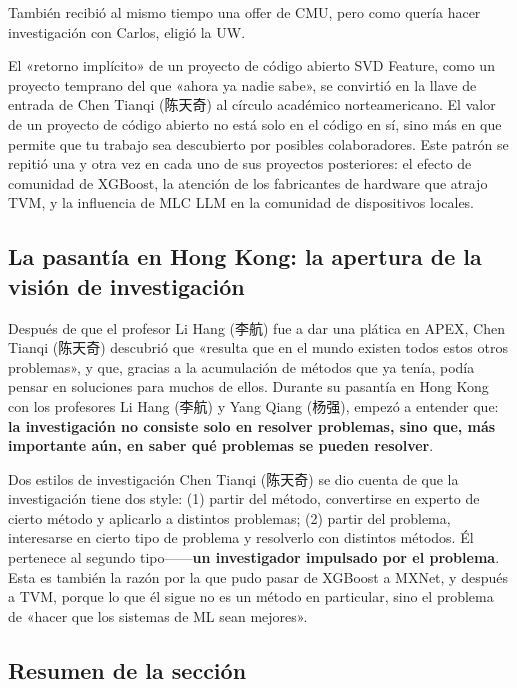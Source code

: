 \documentclass[a4paper]{article}
\begin{document}
También recibió al mismo tiempo una offer de CMU, pero como quería hacer investigación con Carlos, eligió la UW.

\begin{knowledgebox}{El «retorno implícito» de un proyecto de código abierto}
SVD Feature, como un proyecto temprano del que «ahora ya nadie sabe», se convirtió en la llave de entrada de Chen Tianqi (陈天奇) al círculo académico norteamericano. El valor de un proyecto de código abierto no está solo en el código en sí, sino más en que permite que tu trabajo sea descubierto por posibles colaboradores. Este patrón se repitió una y otra vez en cada uno de sus proyectos posteriores: el efecto de comunidad de XGBoost, la atención de los fabricantes de hardware que atrajo TVM, y la influencia de MLC LLM en la comunidad de dispositivos locales.
\end{knowledgebox}

\subsection{La pasantía en Hong Kong: la apertura de la visión de investigación}

Después de que el profesor Li Hang (李航) fue a dar una plática en APEX, Chen Tianqi (陈天奇) descubrió que «resulta que en el mundo existen todos estos otros problemas», y que, gracias a la acumulación de métodos que ya tenía, podía pensar en soluciones para muchos de ellos. Durante su pasantía en Hong Kong con los profesores Li Hang (李航) y Yang Qiang (杨强), empezó a entender que: \textbf{la investigación no consiste solo en resolver problemas, sino que, más importante aún, en saber qué problemas se pueden resolver}.

\begin{knowledgebox}{Dos estilos de investigación}
Chen Tianqi (陈天奇) se dio cuenta de que la investigación tiene dos style: (1) partir del método, convertirse en experto de cierto método y aplicarlo a distintos problemas; (2) partir del problema, interesarse en cierto tipo de problema y resolverlo con distintos métodos. Él pertenece al segundo tipo------\textbf{un investigador impulsado por el problema}. Esta es también la razón por la que pudo pasar de XGBoost a MXNet, y después a TVM, porque lo que él sigue no es un método en particular, sino el problema de «hacer que los sistemas de ML sean mejores».
\end{knowledgebox}

\subsection{Resumen de la sección}
\end{document}
